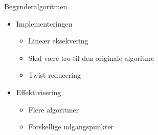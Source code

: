 \begin{frame}{Begynderalgoritmen}
\begin{itemize}
	\item Implementeringen
	\begin{itemize}
		\item Line\ae{}r eksekvering
		\item Skal v\ae{}re tro til den originale algoritme
		\item Twist reducering
	\end{itemize}
	\item Effektivisering
	\begin{itemize}
		\item Flere algoritmer
		\item Forskellige udgangspunkter
	\end{itemize}
\end{itemize}
\end{frame}